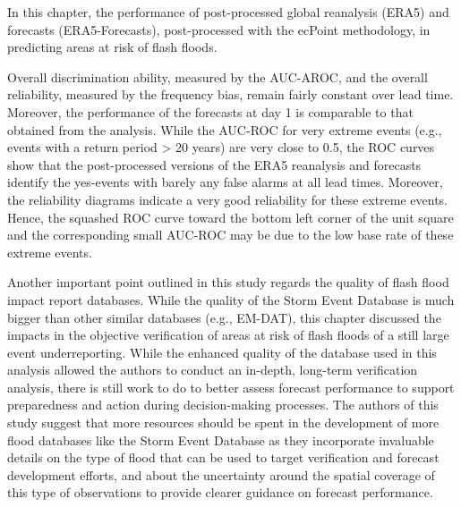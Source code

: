 In this chapter, the performance of post-processed global reanalysis (ERA5) and forecasts (ERA5-Forecasts), post-processed with the ecPoint methodology, in predicting areas at risk of flash floods. 

Overall discrimination ability, measured by the AUC-AROC, and the overall reliability, measured by the frequency bias, remain fairly constant over lead time. Moreover, the performance of the forecasts at day 1 is comparable to that obtained from the analysis. While the AUC-ROC for very extreme events (e.g., events with a return period > 20 years) are very close to 0.5, the ROC curves show that the post-processed versions of the ERA5 reanalysis and forecasts identify the yes-events with barely any false alarms at all lead times. Moreover, the reliability diagrams indicate a very good reliability for these extreme events. Hence, the squashed ROC curve toward the bottom left corner of the unit square and the corresponding small AUC-ROC may be due to the low base rate of these extreme events.

Another important point outlined in this study regards the quality of flash flood impact report databases. While the quality of the Storm Event Database is much bigger than other similar databases (e.g., EM-DAT), this chapter discussed the impacts in the objective verification of areas at risk of flash floods of a still large event underreporting. While the enhanced quality of the database used in this analysis allowed the authors to conduct an in-depth, long-term verification analysis, there is still work to do to better assess forecast performance to support preparedness and action during decision-making processes. The authors of this study suggest that more resources should be spent in the development of more flood databases like the Storm Event Database as they incorporate invaluable details on the type of flood that can be used to target verification and forecast development efforts, and about the uncertainty around the spatial coverage of this type of observations to provide clearer guidance on forecast performance.